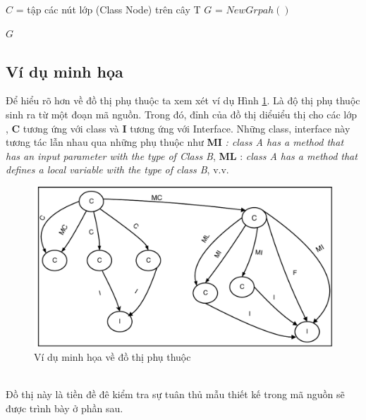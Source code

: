 \documentclass[12pt]{report}
\newenvironment{thuattoan}[1][h]
  {\renewcommand{\algorithmcfname}{Thuật toán}
   \begin{algorithm}[#1]
  }{\end{algorithm}}
\begin{document}
\begin{thuattoan}[!htbp]
		\label{algo:dependency-analyze}
		\caption{$JavaDependencyAnalyze(Root)$}
		$C$ = tập các nút lớp (Class Node) trên cây T \;
		$G$ = $New Grpah()$\;
	
		\Return $G$\;
\end{thuattoan}
\subsection{Ví dụ minh họa}
\noindent Để hiểu rõ hơn về đồ thị phụ thuộc ta xem xét ví dụ Hình \ref{fig:example_graph_dependency}. Là độ thị phụ thuộc sinh ra từ một đoạn mã nguồn. Trong đó, đỉnh của đồ thị diểuiểu thị cho các lớp , \textbf{C} tương ứng với class và \textbf{I} tương ứng với Interface. Những class, interface này tương tác lẫn nhau qua những phụ thuộc như \textbf{MI} \textit{: class A has a method that has an input parameter with the type of Class B}, \textbf{ML} : \textit{class A has a method that defines a local variable with the type of class B}, v.v.\\
\begin{figure}[!htbp]
	\centering
	\vspace{-1cm}
	\includegraphics[scale=1]{images/dependency_graph}
	\caption{Ví dụ minh họa về đồ thị phụ thuộc}
	\label{fig:example_graph_dependency}
\end{figure}\\
Đồ thị này là tiền đề đê kiểm tra sự tuân thủ mẫu thiết kế trong mã nguồn sẽ được trình bày ở phần sau.
\pagebreak
\end{document}
